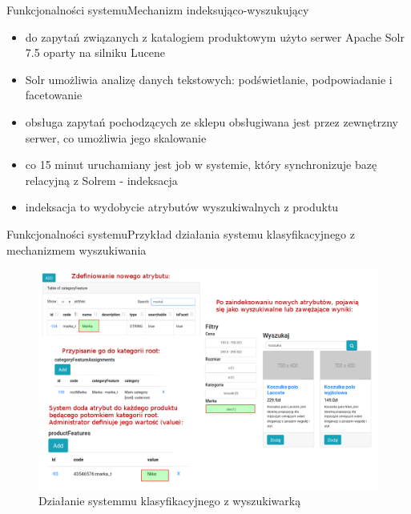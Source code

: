 \documentclass[polish,xcolor=table,9pt,aspectratio=1610,hyperref={pdfpagemode=FullScreen}]{beamer}
\begin{document}
\begin{frame}{Funkcjonalności systemu}{Mechanizm indeksująco-wyszukujący}
\begin{itemize}
	\item<1-> do zapytań związanych z katalogiem produktowym użyto serwer Apache Solr 7.5 oparty na silniku Lucene
	\item<1-> Solr umożliwia analizę danych tekstowych: podświetlanie, podpowiadanie i facetowanie 
	\item<1-> obsługa zapytań pochodzących ze sklepu obsługiwana jest przez zewnętrzny serwer, co umożliwia jego skalowanie
	\item<1-> co 15 minut uruchamiany jest job w systemie, który synchronizuje bazę relacyjną z Solrem - indeksacja
	\item<1-> indeksacja to wydobycie atrybutów wyszukiwalnych z produktu
\end{itemize}
\end{frame}

\begin{frame}{Funkcjonalności systemu}{Przykład działania systemu klasyfikacyjnego z mechanizmem wyszukiwania}
	\begin{figure}
		\begin{center}
			\includegraphics[scale=0.3]{sysklas-wyszfacet.png}
		\end{center}
		\caption{{\color{black}Działanie systemmu klasyfikacyjnego z wyszukiwarką}} 
	\end{figure}
\end{frame}
\end{document}
